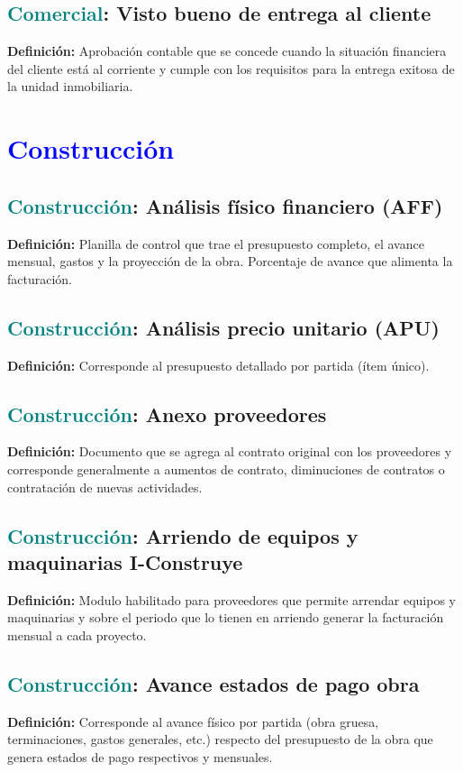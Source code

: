 \documentclass[12pt]{article}
\begin{document}
\subsection{\textcolor{teal}{Comercial}: Visto bueno de entrega al cliente}
\textbf{Definición:} Aprobación contable que se concede cuando la situación financiera del cliente está al corriente y cumple con los requisitos para la entrega exitosa de la unidad inmobiliaria.
\section{\textcolor{blue}{Construcción}}
\subsection{\textcolor{teal}{Construcción}: Análisis físico financiero (AFF)}
\textbf{Definición:} Planilla de control que trae el presupuesto completo, el avance mensual, gastos y la proyección de la obra. Porcentaje de avance que alimenta la facturación.
\subsection{\textcolor{teal}{Construcción}: Análisis precio unitario (APU)}
\textbf{Definición:} Corresponde al presupuesto detallado por partida (ítem único).
\subsection{\textcolor{teal}{Construcción}: Anexo proveedores}
\textbf{Definición:} Documento que se agrega al contrato original con los proveedores y corresponde generalmente a aumentos de contrato, diminuciones de contratos o contratación de nuevas actividades.
\subsection{\textcolor{teal}{Construcción}: Arriendo de equipos y maquinarias I-Construye}
\textbf{Definición:} Modulo habilitado para proveedores que permite arrendar equipos y maquinarias y sobre el periodo que lo tienen en arriendo generar la facturación mensual a cada proyecto.
\subsection{\textcolor{teal}{Construcción}: Avance estados de pago obra}
\textbf{Definición:} Corresponde al avance físico por partida (obra gruesa, terminaciones, gastos generales, etc.) respecto del presupuesto de la obra que genera estados de pago respectivos y mensuales.
\end{document}
